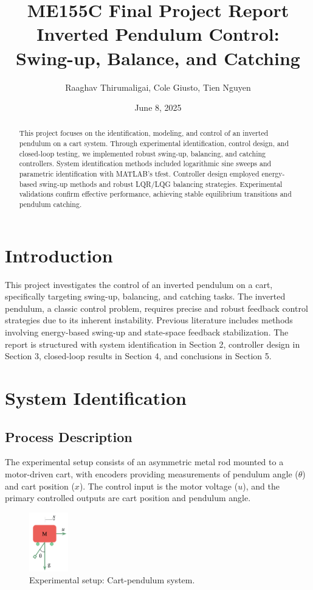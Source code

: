 \documentclass[12pt]{article}
\title{ME155C Final Project Report\\Inverted Pendulum Control: Swing-up, Balance, and Catching}
\author{Raaghav Thirumaligai, Cole Giusto, Tien Nguyen}
\date{June 8, 2025}
\begin{document}
\maketitle

\begin{abstract}
This project focuses on the identification, modeling, and control of an inverted pendulum on a cart system. Through experimental identification, control design, and closed-loop testing, we implemented robust swing-up, balancing, and catching controllers. System identification methods included logarithmic sine sweeps and parametric identification with MATLAB's tfest. Controller design employed energy-based swing-up methods and robust LQR/LQG balancing strategies. Experimental validations confirm effective performance, achieving stable equilibrium transitions and pendulum catching.
\end{abstract}

\section{Introduction}
This project investigates the control of an inverted pendulum on a cart, specifically targeting swing-up, balancing, and catching tasks. The inverted pendulum, a classic control problem, requires precise and robust feedback control strategies due to its inherent instability. Previous literature includes methods involving energy-based swing-up and state-space feedback stabilization. The report is structured with system identification in Section 2, controller design in Section 3, closed-loop results in Section 4, and conclusions in Section 5.

\section{System Identification}

\subsection{Process Description}
The experimental setup consists of an asymmetric metal rod mounted to a motor-driven cart, with encoders providing measurements of pendulum angle ($\theta$) and cart position ($x$). The control input is the motor voltage ($u$), and the primary controlled outputs are cart position and pendulum angle.

\begin{figure}[H]
    \centering
    \includegraphics[width=0.15\textwidth]{figures/system_setup.png}
    \caption{Experimental setup: Cart-pendulum system.}
    \label{fig:setup}
\end{figure}
\end{document}
